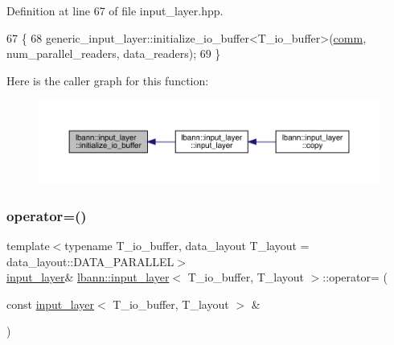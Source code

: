 Definition at line 67 of file input\+\_\+layer.\+hpp.


\begin{DoxyCode}
67                                                                                                            
                                      \{
68     generic\_input\_layer::initialize\_io\_buffer<T\_io\_buffer>(\hyperlink{file__io_8cpp_ab048c6f9fcbcfaa57ce68b00263dbebe}{comm}, num\_parallel\_readers, data\_readers);
69   \}
\end{DoxyCode}
Here is the caller graph for this function\+:\nopagebreak
\begin{figure}[H]
\begin{center}
\leavevmode
\includegraphics[width=350pt]{classlbann_1_1input__layer_a645fce2e882892ac0ad8c9b06ea6ed09_icgraph}
\end{center}
\end{figure}
\mbox{\label{classlbann_1_1input__layer_a8b00d107daef436d141344277526b682}} 
\subsubsection{\texorpdfstring{operator=()}{operator=()}}
{\footnotesize\ttfamily template$<$typename T\+\_\+io\+\_\+buffer, data\+\_\+layout T\+\_\+layout = data\+\_\+layout\+::\+D\+A\+T\+A\+\_\+\+P\+A\+R\+A\+L\+L\+EL$>$ \\
\hyperlink{classlbann_1_1input__layer}{input\+\_\+layer}\& \hyperlink{classlbann_1_1input__layer}{lbann\+::input\+\_\+layer}$<$ T\+\_\+io\+\_\+buffer, T\+\_\+layout $>$\+::operator= (\begin{DoxyParamCaption}\item[{const \hyperlink{classlbann_1_1input__layer}{input\+\_\+layer}$<$ T\+\_\+io\+\_\+buffer, T\+\_\+layout $>$ \&}]{ }\end{DoxyParamCaption})\hspace{0.3cm}{\ttfamily [default]}}


